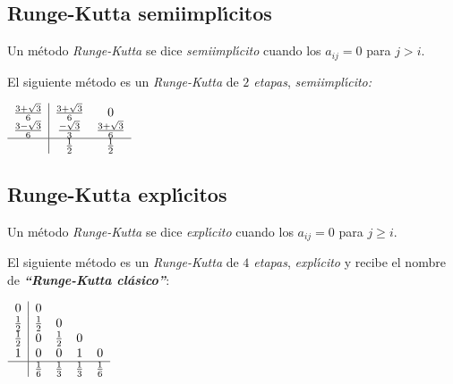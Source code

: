 \subsection{Runge-Kutta semiimpl\'{\i}citos}

Un m\'etodo \emph{Runge-Kutta} se dice \emph{semiimpl\'{\i}cito} cuando los
$a_{ij} = 0$ para $j > i$.\newline

El siguiente m\'etodo es un \emph{Runge-Kutta} de \emph{$2$ etapas},
\emph{semiimpl\'{\i}cito:}

\begin{center}
$
\begin{array}{c|cc}
\frac{3+\sqrt 3}{6} & \frac{3+\sqrt 3}{6} & 0 \\
\frac{3-\sqrt 3}{6} & \frac{-\sqrt 3}{3} & \frac {3+\sqrt 3}{6} \\
\hline
 & \frac{1}{2} & \frac{1}{2}
\end{array}
$
\end{center}

\subsection{Runge-Kutta expl\'{\i}citos}

Un m\'etodo \emph{Runge-Kutta} se dice \emph{expl\'{\i}cito} cuando los 
$a_{ij} = 0$ para $j \geq i$.\newline

El siguiente m\'etodo es un \emph{Runge-Kutta} de \emph{$4$ etapas}, 
\emph{expl\'{\i}cito} y recibe el nombre de 
\emph{\textbf{``Runge-Kutta cl\'asico''}}:\newline

\begin{center}
$
\begin{array}{c|cccc}
0 & 0 \\
\frac{1}{2} & \frac{1}{2} & 0 \\
\frac{1}{2} & 0 & \frac{1}{2} & 0 \\
1 & 0 & 0 & 1 & 0 \\
\hline
 & \frac{1}{6} & \frac{1}{3} & \frac{1}{3} & \frac{1}{6}
\end{array}
$
\end{center}

